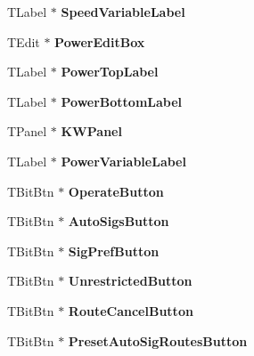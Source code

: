 \begin{DoxyCompactItemize}
T\+Label $\ast$ {\bfseries Speed\+Variable\+Label}
\item 
\mbox{\label{class_t_interface_a2f56a6d6c2174a48f86eb1c2a44fc918}} 
T\+Edit $\ast$ {\bfseries Power\+Edit\+Box}
\item 
\mbox{\label{class_t_interface_a115be70cbac0d0c8609bd2d3d4c6515f}} 
T\+Label $\ast$ {\bfseries Power\+Top\+Label}
\item 
\mbox{\label{class_t_interface_ac1de622db396402dd80fb06ae10f550a}} 
T\+Label $\ast$ {\bfseries Power\+Bottom\+Label}
\item 
\mbox{\label{class_t_interface_a66f500e3b3362042e12da9a2749f9fff}} 
T\+Panel $\ast$ {\bfseries K\+W\+Panel}
\item 
\mbox{\label{class_t_interface_a6f2b5ba2e310e1884fa338f537ce6496}} 
T\+Label $\ast$ {\bfseries Power\+Variable\+Label}
\item 
\mbox{\label{class_t_interface_a2dab1f7efbc4b609f97c28c3c28df5c9}} 
T\+Bit\+Btn $\ast$ {\bfseries Operate\+Button}
\item 
\mbox{\label{class_t_interface_a33594e732f59b3c3f838ace59177061c}} 
T\+Bit\+Btn $\ast$ {\bfseries Auto\+Sigs\+Button}
\item 
\mbox{\label{class_t_interface_a93e07f384754d76e4874436c2bb714e3}} 
T\+Bit\+Btn $\ast$ {\bfseries Sig\+Pref\+Button}
\item 
\mbox{\label{class_t_interface_a68ff82d32f0c984c9b186fae5d3a758d}} 
T\+Bit\+Btn $\ast$ {\bfseries Unrestricted\+Button}
\item 
\mbox{\label{class_t_interface_a3a1745cd5a327b9f5d518692b781ddc8}} 
T\+Bit\+Btn $\ast$ {\bfseries Route\+Cancel\+Button}
\item 
\mbox{\label{class_t_interface_a3d7c55fdfa676ee01f58b85b0e46de0a}} 
T\+Bit\+Btn $\ast$ {\bfseries Preset\+Auto\+Sig\+Routes\+Button}
\item 

\end{DoxyCompactItemize}
